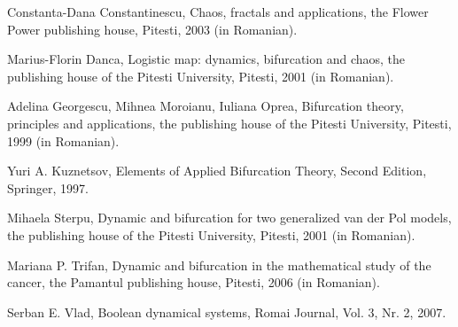 \documentclass[12pt]{article}\usepackage{amsmath}
\begin{document}
\begin{thebibliography}{9}                                                                                                

Constanta-Dana Constantinescu, Chaos, fractals and
applications, the Flower Power publishing house, Pitesti, 2003 (in Romanian).

Marius-Florin Danca, Logistic map: dynamics, bifurcation and
chaos, the publishing house of the Pitesti University, Pitesti, 2001 (in Romanian).

Adelina Georgescu, Mihnea Moroianu, Iuliana Oprea, Bifurcation
theory, principles and applications, the publishing house of the Pitesti
University, Pitesti, 1999 (in Romanian).

Yuri A. Kuznetsov, Elements of Applied Bifurcation Theory,
Second Edition, Springer, 1997.

Mihaela Sterpu, Dynamic and bifurcation for two generalized van
der Pol models, the publishing house of the Pitesti University, Pitesti, 2001
(in Romanian).

Mariana P. Trifan, Dynamic and bifurcation in the mathematical
study of the cancer, the Pamantul publishing house, Pitesti, 2006 (in Romanian).

Serban E. Vlad, Boolean dynamical systems, Romai Journal, Vol.
3, Nr. 2, 2007.
\end{thebibliography}
\end{document}
